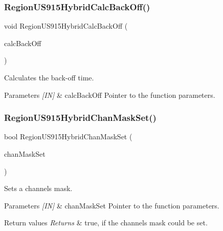 \subsubsection{\texorpdfstring{Region\+U\+S915\+Hybrid\+Calc\+Back\+Off()}{RegionUS915HybridCalcBackOff()}}
{\footnotesize\ttfamily void Region\+U\+S915\+Hybrid\+Calc\+Back\+Off (\begin{DoxyParamCaption}\item[{\hyperlink{group__REGION_ga7c5c9a8da174e6679eded8257dc92fd9}{Calc\+Back\+Off\+Params\+\_\+t} $\ast$}]{calc\+Back\+Off }\end{DoxyParamCaption})}



Calculates the back-\/off time. 


\begin{DoxyParams}{Parameters}
{\em \mbox{[}\+I\+N\mbox{]}} & calc\+Back\+Off Pointer to the function parameters. \\
\hline
\end{DoxyParams}
\mbox{\label{group__REGIONUS915HYB_gab7d8969e0b1037572a6703d7995c44e3}} 
\subsubsection{\texorpdfstring{Region\+U\+S915\+Hybrid\+Chan\+Mask\+Set()}{RegionUS915HybridChanMaskSet()}}
{\footnotesize\ttfamily bool Region\+U\+S915\+Hybrid\+Chan\+Mask\+Set (\begin{DoxyParamCaption}\item[{\hyperlink{group__REGION_ga6d24f7da136006410827dfb29f6b9b9e}{Chan\+Mask\+Set\+Params\+\_\+t} $\ast$}]{chan\+Mask\+Set }\end{DoxyParamCaption})}



Sets a channels mask. 


\begin{DoxyParams}{Parameters}
{\em \mbox{[}\+I\+N\mbox{]}} & chan\+Mask\+Set Pointer to the function parameters.\\
\hline
\end{DoxyParams}

\begin{DoxyRetVals}{Return values}
{\em Returns} & true, if the channels mask could be set. \\
\hline
\end{DoxyRetVals}
\mbox{\label{group__REGIONUS915HYB_ga82fc4da7c52d7b26a8fcd8704c8af9ab}} 
